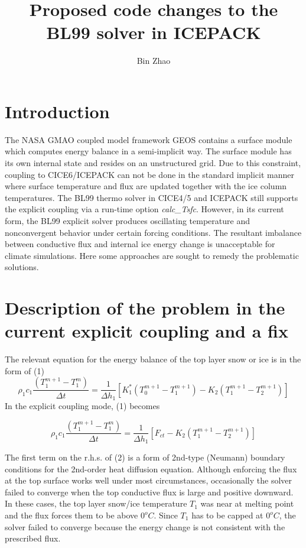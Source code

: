 \documentclass[10pt,letterpaper,oneside]{article}
\title{Proposed code changes to the BL99 solver in ICEPACK}
\author{Bin Zhao}
\begin{document}
\lstset{language=Fortran}  
\section{Introduction}
The NASA GMAO coupled model framework GEOS contains a surface module which computes energy balance in a semi-implicit way. The surface module has its own internal state and resides on an unstructured grid. Due to this constraint, coupling to CICE6/ICEPACK can not be done in the standard implicit manner where surface temperature and flux are updated together with the ice column temperatures. The BL99 thermo solver in CICE4/5 and ICEPACK still supports the explicit coupling via a run-time option \emph{calc\_Tsfc}.  However, in its current form, the BL99 explicit solver produces oscillating temperature and nonconvergent behavior under certain forcing conditions. The resultant imbalance between conductive flux and internal ice energy change is unacceptable for climate simulations. Here some approaches are sought to remedy the problematic solutions.   


\section{Description of the problem in the current explicit coupling and a fix}

The relevant equation for the energy balance of the top layer snow or ice  is in the form of (1) \newline
\begin{equation} 
\rho_{1}c_{1}\frac{\left( T^{m+1}_{1}-T^{m}_{1} \right)}{\Delta{t}}=\frac{1}{\Delta{h_{1}}} \left[ K^{*}_1  \left( T^{m+1}_{0}-T^{m+1}_{1} \right) - K_{2}  \left( T^{m+1}_{1}-T^{m+1}_{2} \right) \right] 
\end{equation}
\newline In the explicit coupling mode, (1) becomes\newline

  \begin{equation} 
  \rho_{1}c_{1}\frac{\left( T^{m+1}_{1}-T^{m}_{1} \right)}{\Delta{t}}=\frac{1}{\Delta{h_{1}}} \left[ F_{ct} - K_{2}  \left( T^{m+1}_{1}-T^{m+1}_{2} \right) \right]
  \end{equation}
   
The first term on the r.h.s. of (2) is a form of 2nd-type (Neumann) boundary conditions for the 2nd-order heat diffusion equation. Although enforcing the flux at the top surface works well under most circumstances, occasionally the solver failed to converge when the top conductive flux is large and positive downward. In these cases, the top layer snow/ice temperature $T_{1}$ was near at melting point and the flux forces them to be above $0^{o}C$. Since $T_{1}$ has to be capped at $0^{o}C$, the solver failed to converge because the energy change is not consistent with the prescribed flux.     \newline
\end{document}
